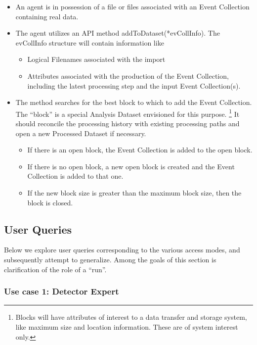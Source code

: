 \documentclass{cmspaper}
\begin{document}
\begin{itemize}
\item An agent is in possession of a file or files associated with an Event Collection
containing real data.
\item The agent utilizes an API method addToDataset(*evCollInfo).  The evCollInfo structure 
will contain information like 
\begin{itemize}
\item Logical Filenames associated with the import
\item Attributes associated with the production of the Event Collection, 
including the latest processing step and the input Event Collection(s). 
\end{itemize}
\item The method searches for the best block to which to add the Event Collection.  
The ``block'' is a special Analysis Dataset envisioned for this purpose.  
\footnote{Blocks will have attributes of interest to a data transfer and storage 
system, like maximum size and location information. These are of system interest only.}
It should reconcile the processing history with existing processing paths and 
open a new Processed Dataset if necessary.
\begin{itemize}
\item If there is an open block, the Event Collection is added to the open block.
\item If there is no open block, a new open block is created and the Event Collection is added to that one.
\item If the new block size is greater than the maximum block size, then the block is closed.  
\end{itemize}
\end{itemize}

\subsection{User Queries}

Below we explore user queries corresponding to the various access modes,
and subsequently attempt to generalize. Among the goals of this section
is clarification of the role of a ``run''.

\subsubsection{Use case 1: Detector Expert}
\end{document}
